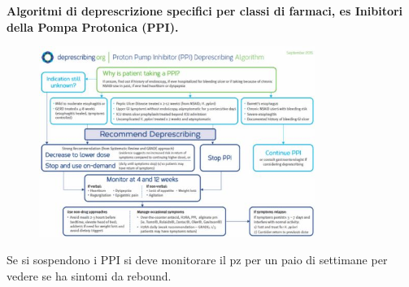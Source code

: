   \textbf{Algoritmi di deprescrizione specifici per classi di farmaci,
  es Inibitori della Pompa Protonica (PPI).}

  \begin{figure}[!ht]
\centering
	\includegraphics[width=0.8\textwidth]{37/image5.jpg}
	\end{figure}

  Se si sospendono i PPI si deve monitorare il pz per un paio di
  settimane per vedere se ha sintomi da rebound.
